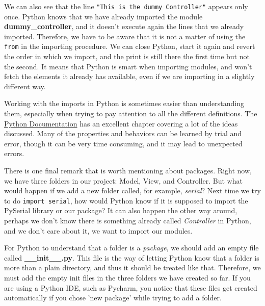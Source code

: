 We can also see that the line \texttt{"This is the dummy Controller"} appears only once. Python knows that we have already imported the module \textbf{dummy\_controller}, and it doesn't execute again the lines that we already imported. Therefore, we have to be aware that it is not a matter of using the \texttt{from} in the importing procedure. We can close Python, start it again and revert the order in which we import, and the print is still there the first time but not the second. It means that Python is smart when importing modules, and won't fetch the elements it already has available, even if we are importing in a slightly different way.


Working with the imports in Python is sometimes easier than understanding them, especially when trying to pay attention to all the different definitions. The \href{https://docs.python.org/3.6/tutorial/modules.html}{Python Documentation} has an excellent chapter covering a lot of the ideas discussed. Many of the properties and behaviors can be learned by trial and error, though it can be very time consuming, and it may lead to unexpected errors.

There is one final remark that is worth mentioning about packages. Right now, we have three folders in our project: Model, View, and Controller. But what would happen if we add a new folder called, for example, \emph{serial}? Next time we try to do \texttt{import serial}, how would Python know if it is supposed to import the PySerial library or our package? It can also happen the other way around, perhaps we don't know there is something already called \emph{Controller} in Python, and we don't care about it, we want to import our modules.

For Python to understand that a folder is a \emph{package}, we should add an empty file called \textbf{\_\_init\_\_.py}. This file is the way of letting Python know that a folder is more than a plain directory, and thus it should be treated like that. Therefore, we must add the empty init files in the three folders we have created so far. If you are using a Python IDE, such as Pycharm, you notice that these files get created automatically if you chose 'new package' while trying to add a folder.

